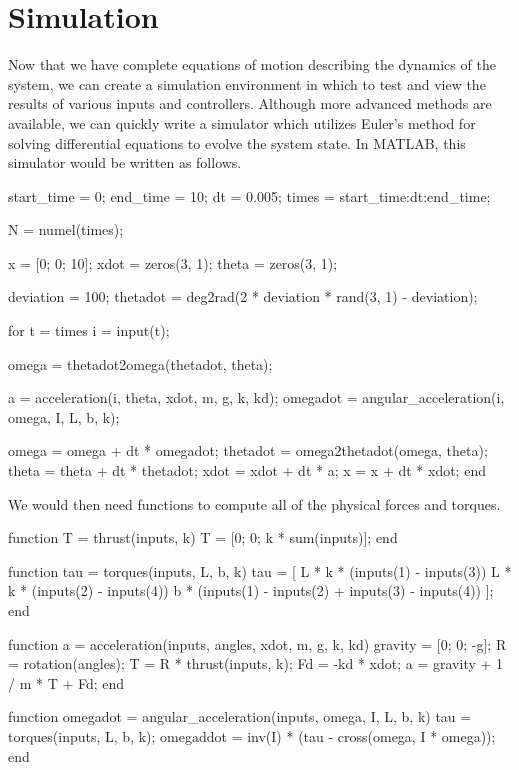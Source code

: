 \documentclass{article}
\begin{document}
\section*{Simulation}
Now that we have complete equations of motion describing the dynamics of the system, we can create a
simulation environment in which to test and view the results of various inputs and controllers.
Although more advanced methods are available, we can quickly write a simulator which utilizes
Euler's method for solving differential equations to evolve the system state. In MATLAB, this
simulator would be written as follows.
\begin{matlabcode}
start_time = 0;
end_time = 10;
dt = 0.005;
times = start_time:dt:end_time;

N = numel(times);

x = [0; 0; 10];
xdot = zeros(3, 1);
theta = zeros(3, 1);

deviation = 100;
thetadot = deg2rad(2 * deviation * rand(3, 1) - deviation);

for t = times
    i = input(t);

    omega = thetadot2omega(thetadot, theta);

    a = acceleration(i, theta, xdot, m, g, k, kd);
    omegadot = angular_acceleration(i, omega, I, L, b, k);

    omega = omega + dt * omegadot;
    thetadot = omega2thetadot(omega, theta); 
    theta = theta + dt * thetadot;
    xdot = xdot + dt * a;
    x = x + dt * xdot;
end
\end{matlabcode}
We would then need functions to compute all of the physical forces and torques.
\begin{matlabcode}
function T = thrust(inputs, k)
    T = [0; 0; k * sum(inputs)];
end

function tau = torques(inputs, L, b, k)
    tau = [
        L * k * (inputs(1) - inputs(3))
        L * k * (inputs(2) - inputs(4))
        b * (inputs(1) - inputs(2) + inputs(3) - inputs(4))
    ];
end

function a = acceleration(inputs, angles, xdot, m, g, k, kd)
    gravity = [0; 0; -g];
    R = rotation(angles);
    T = R * thrust(inputs, k);
    Fd = -kd * xdot;
    a = gravity + 1 / m * T + Fd;
end

function omegadot = angular_acceleration(inputs, omega, I, L, b, k)
    tau = torques(inputs, L, b, k);
    omegaddot = inv(I) * (tau - cross(omega, I * omega));
end
\end{matlabcode}
\end{document}
